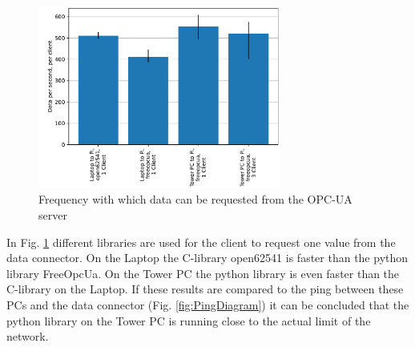 \documentclass[conference]{IEEEtran}
\begin{document}
\begin{figure}[htbp]
    \centerline{\includegraphics[width=8cm]{Pictures/OPCUASpeed1D.pdf}}
    \caption{Frequency with which data can be requested from the OPC-UA server}
    \label{fig:OPCUASpeed1D}
\end{figure}
In Fig. \ref{fig:OPCUASpeed1D} different libraries are used for the client to request one value from the data connector.
On the Laptop the C-library open62541 is faster than the python library FreeOpcUa.
On the Tower PC the python library is even faster than the C-library on the Laptop.
If these results are compared to the ping between these PCs and the data connector (Fig. \ref{fig:PingDiagram}) it can be concluded that the python library on the Tower PC is running close to the actual limit of the network.\\
\end{document}
